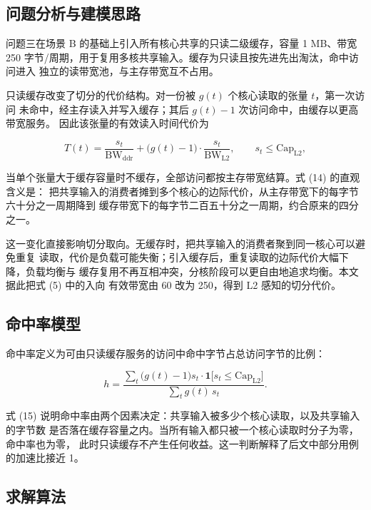 \documentclass[bwprint]{gmcmthesis}
\begin{document}
\subsection{问题分析与建模思路}

问题三在场景 B 的基础上引入所有核心共享的只读二级缓存，容量 1 MB、带宽
250 字节/周期，用于复用多核共享输入。缓存为只读且按先进先出淘汰，命中访问进入
独立的读带宽池，与主存带宽互不占用。

只读缓存改变了切分的代价结构。对一份被 $g(t)$ 个核心读取的张量 $t$，第一次访问
未命中，经主存读入并写入缓存；其后 $g(t)-1$ 次访问命中，由缓存以更高带宽服务。
因此该张量的有效读入时间代价为

\begin{equation}
T(t)=\frac{s_t}{\mathrm{BW}_{\mathrm{ddr}}}+\bigl(g(t)-1\bigr)\cdot
\frac{s_t}{\mathrm{BW}_{\mathrm{L2}}},
\qquad s_t\le \mathrm{Cap}_{\mathrm{L2}},
\end{equation}

当单个张量大于缓存容量时不缓存，全部访问都按主存带宽结算。式 (14) 的直观含义是：
把共享输入的消费者摊到多个核心的边际代价，从主存带宽下的每字节六十分之一周期降到
缓存带宽下的每字节二百五十分之一周期，约合原来的四分之一。

这一变化直接影响切分取向。无缓存时，把共享输入的消费者聚到同一核心可以避免重复
读取，代价是负载可能失衡；引入缓存后，重复读取的边际代价大幅下降，负载均衡与
缓存复用不再互相冲突，分核阶段可以更自由地追求均衡。本文据此把式 (5) 中的入向
有效带宽由 60 改为 250，得到 L2 感知的切分代价。

\subsection{命中率模型}

命中率定义为可由只读缓存服务的访问中命中字节占总访问字节的比例：

\begin{equation}
h=\frac{\sum_{t}\bigl(g(t)-1\bigr)s_t\cdot
\mathbf{1}\bigl[s_t\le \mathrm{Cap}_{\mathrm{L2}}\bigr]}
{\sum_{t}g(t)\,s_t}.
\end{equation}

式 (15) 说明命中率由两个因素决定：共享输入被多少个核心读取，以及共享输入的字节数
是否落在缓存容量之内。当所有输入都只被一个核心读取时分子为零，命中率也为零，
此时只读缓存不产生任何收益。这一判断解释了后文中部分用例的加速比接近 1。

\subsection{求解算法}
\end{document}
